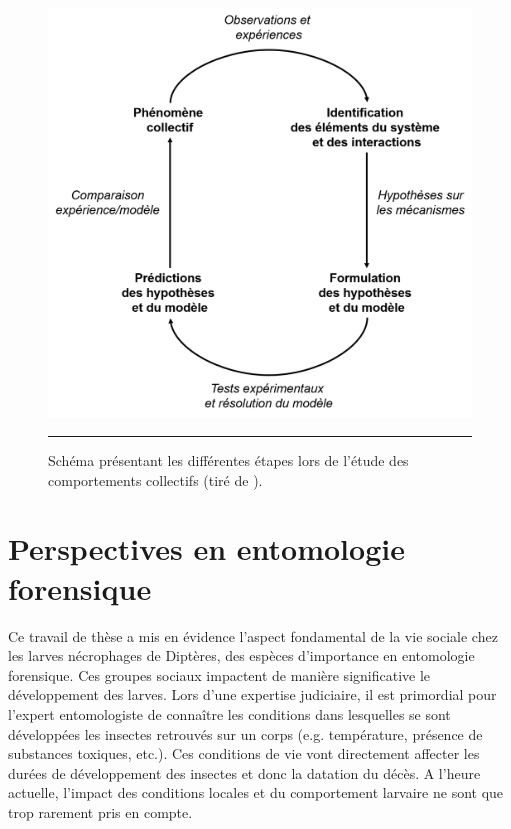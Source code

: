 \begin{figure}[ht]
	\centering
		\includegraphics[width=0.8 \textwidth]{Figures/modelisation.png}
		\rule{35em}{0.5pt}
	\caption[Model]{Schéma présentant les différentes étapes lors de l'étude des comportements collectifs (tiré de \citet{camazine_self-organization_2001}).}
	\label{fig:model}
\end{figure}


    \section{Perspectives en entomologie forensique}
    
Ce travail de thèse a mis en évidence l'aspect fondamental de la vie sociale chez les larves nécrophages de Diptères, des espèces d'importance en entomologie forensique. Ces groupes sociaux impactent de manière significative le développement des larves. Lors d'une expertise judiciaire, il est primordial pour l'expert entomologiste de connaître les conditions dans lesquelles se sont développées les insectes retrouvés sur un corps (e.g. température, présence de substances toxiques, etc.). Ces conditions de vie vont directement affecter les durées de développement des insectes et donc la datation du décès. A l'heure actuelle, l'impact des conditions locales et du comportement larvaire ne sont que trop rarement pris en compte.

